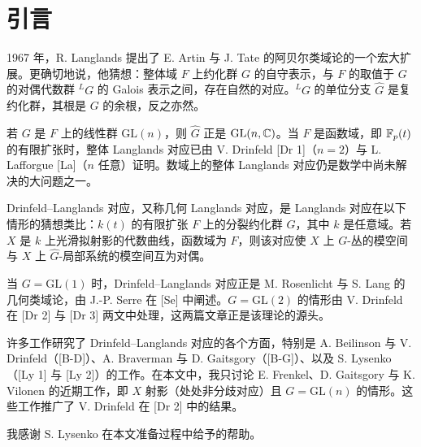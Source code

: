 \section*{引言}

1967 年，R. Langlands 提出了 E. Artin 与 J. Tate 的阿贝尔类域论的一个宏大扩展。更确切地说，他猜想：整体域 $F$ 上约化群 $G$ 的自守表示，与 $F$ 的取值于 $G$ 的对偶代数群 ${}^{L}G$ 的 Galois 表示之间，存在自然的对应。${}^{L}G$ 的单位分支 $\widehat{G}$ 是复约化群，其根是 $G$ 的余根，反之亦然。

若 $G$ 是 $F$ 上的线性群 $\mathrm{GL}(n)$，则 $\widehat{G}$ 正是 $\mathrm{GL}(n,\mathbb{C})$。当 $F$ 是函数域，即 $\mathbb{F}_p(t)$ 的有限扩张时，整体 Langlands 对应已由 V. Drinfeld [Dr 1]（$n=2$）与 L. Lafforgue [La]（$n$ 任意）证明。数域上的整体 Langlands 对应仍是数学中尚未解决的大问题之一。

Drinfeld–Langlands 对应，又称几何 Langlands 对应，是 Langlands 对应在以下情形的猜想类比：$k(t)$ 的有限扩张 $F$ 上的分裂约化群 $G$，其中 $k$ 是任意域。若 $X$ 是 $k$ 上光滑拟射影的代数曲线，函数域为 $F$，则该对应使 $X$ 上 $G$-丛的模空间与 $X$ 上 $\widehat{G}$-局部系统的模空间互为对偶。

当 $G=\mathrm{GL}(1)$ 时，Drinfeld–Langlands 对应正是 M. Rosenlicht 与 S. Lang 的几何类域论，由 J.-P. Serre 在 [Se] 中阐述。$G=\mathrm{GL}(2)$ 的情形由 V. Drinfeld 在 [Dr 2] 与 [Dr 3] 两文中处理，这两篇文章正是该理论的源头。

许多工作研究了 Drinfeld–Langlands 对应的各个方面，特别是 A. Beilinson 与 V. Drinfeld（[B-D]）、A. Braverman 与 D. Gaitsgory（[B-G]）、以及 S. Lysenko（[Ly 1] 与 [Ly 2]）的工作。在本文中，我只讨论 E. Frenkel、D. Gaitsgory 与 K. Vilonen 的近期工作，即 $X$ 射影（处处非分歧对应）且 $G=\mathrm{GL}(n)$ 的情形。这些工作推广了 V. Drinfeld 在 [Dr 2] 中的结果。

我感谢 S. Lysenko 在本文准备过程中给予的帮助。
